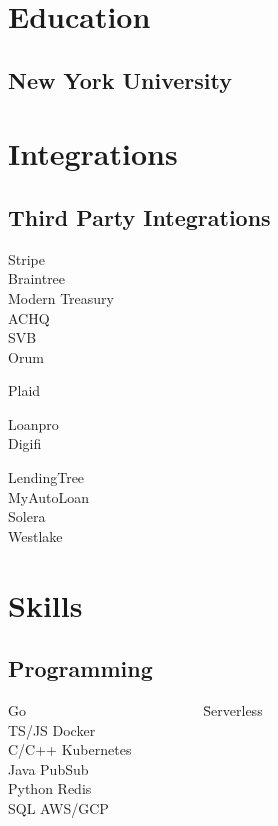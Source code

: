 \documentclass[letterpaper]{deedy-resume}
\begin{document}
\begin{minipage}[t]{0.31\textwidth} 

\section{Education} 
\subsection{New York University}
\sectionspace

\section{Integrations}
\subsection{Third Party Integrations}
Stripe \\
Braintree \\
Modern Treasury \\
ACHQ \\
SVB \\
Orum \\
\sectionspace

Plaid \\
\sectionspace

Loanpro \\
Digifi \\
\sectionspace

LendingTree \\
MyAutoLoan \\
Solera \\
Westlake \\
\sectionspace

\section{Skills}
\subsection{Programming}
\begin{tabbing}
Go ~~~~~~~~~~~~~~~~~~~~~~~~ \=Serverless \\
TS/JS                       \> Docker \\
C/C++                       \> Kubernetes \\
Java                        \> PubSub \\
Python                      \> Redis \\
SQL                         \> AWS/GCP \\
\end{tabbing}

\end{minipage} 
\end{document}
